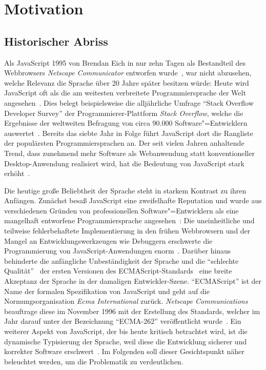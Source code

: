 \chapter{Motivation}
\label{chap:motiviation}

\section{Historischer Abriss}

Als JavaScript 1995 von Brendan Eich in nur zehn Tagen als Bestandteil des Webbrowsers \textit{Netscape Communicator} entworfen wurde~\autocite{SEVERANCE:2012}, war nicht abzusehen, welche Relevanz die Sprache über 20 Jahre später besitzen würde: Heute wird JavaScript oft als die am weitesten verbreitete Programmiersprache der Welt angesehen~\autocite{PAULSON:2007,CROCKFORD:JS_POPULAR}. Dies belegt beispielsweise die alljährliche Umfrage \enquote{Stack Overflow Developer Survey} der Programmierer-Plattform \textit{Stack Overflow}, welche die Ergebnisse der weltweiten Befragung von circa 90.000 Software"=Entwicklern auswertet~\autocite{STACKOVERFLOW:SURVEY}. Bereits das siebte Jahr in Folge führt JavaScript dort die Rangliste der populärsten Programmiersprachen an. Der seit vielen Jahren anhaltende Trend, dass zunehmend mehr Software als Webanwendung statt konventioneller Desktop-Anwendung realisiert wird, hat die Bedeutung von JavaScript stark erhöht~\autocite{TAIVALSAARI:2017,CASTELEYN:2014}.

Die heutige große Beliebtheit der Sprache steht in starkem Kontrast zu ihren Anfängen. Zunächst besaß JavaScript eine zweifelhafte Reputation und wurde aus verschiedenen Gründen von professionellen Software"=Entwicklern als eine mangelhaft entworfene Programmiersprache angesehen~\autocite{CROCKFORD:JS_POPULAR}: Die uneinheitliche und teilweise fehlerbehaftete Implementierung in den frühen Webbrowsern und der Mangel an Entwicklungswerkzeugen wie Debuggern erschwerte die Programmierung von JavaScript-Anwendungen enorm~\autocite{OREILLY:JS_HOW_DID_WE_GET_THERE}. Darüber hinaus behinderte die anfängliche Unbeständigkeit der Sprache und die \enquote{schlechte Qualität}~\autocite{CROCKFORD:JS_MISUNDERSTOOD} der ersten Versionen des ECMAScript-Standards~\autocite{ECMASCRIPT:1997} eine breite Akzeptanz der Sprache in der damaligen Entwickler-Szene. \enquote{ECMAScript} ist der Name der formalen Spezifikation von JavaScript und geht auf die Normungsorganisation \textit{Ecma International} zurück. \textit{Netscape Communications} beauftrage diese im November 1996 mit der Erstellung des Standards, welcher im Jahr darauf unter der Bezeichnung \enquote{ECMA-262} veröffentlicht wurde~\autocite{ECMASCRIPT:1997}. Ein weiterer Aspekt von JavaScript, der bis heute kritisch betrachtet wird, ist die dynamische Typisierung der Sprache, weil diese die Entwicklung sicherer und korrekter Software erschwert~\autocite{NIKHIL:2014,PRADEL:2015}. Im Folgenden soll dieser Gesichtspunkt näher beleuchtet werden, um die Problematik zu verdeutlichen.

